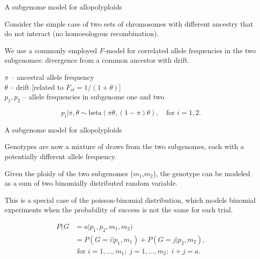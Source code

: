 \documentclass[presentation,sansserif]{beamer}
\begin{document}
\begin{frame}[t]{A subgenome model for allopolyploids}
\pause

Consider the simple case of two sets of chromosomes with different ancestry that do not interact (no homoeologous recombination).
\vspace{0.3in}
\pause

We use a commonly employed $F$-model for correlated allele frequencies in the two subgenomes: divergence from a common ancestor with drift.
\vspace{0.3in}
\pause


$\pi$ -- ancestral allele frequency\\
$\theta$ -- drift [related to $F_{st} = 1/(1+\theta)$] \\
$p_1,p_2$ -- allele frequencies in subgenome one and two\\
\vspace{0.3in}
\pause

\begin{equation}
p_i|\pi,\theta \sim \text{beta}(\pi\theta,(1-\pi)\theta), \quad \text{for } i=1,2.
\end{equation}

\end{frame}

\begin{frame}[t]{A subgenome model for allopolyploids}

Genotypes are now a mixture of draws from the two subgenomes, each with a potentially different allele frequency.
\vspace{0.25in}
\pause

Given the ploidy of the two subgenomes ($m_1$,$m_2$), the genotype can be modeled as a sum of two binomially distributed random variable.
\vspace{0.25in}
\pause

This is a special case of the poisson-binomial distribution, which models binomial experiments when the probability of success is not the same for each trial.
\pause

\begin{align}
P(G&=a|p_1,p_2,m_1,m_2) \nonumber \\[0.05in]
&= P(G=i|p_1,m_1) + P(G=j|p_2,m_2), \nonumber \\[0.05in]
&\text{ for } i=1,\dots,m_1; \; j=1,\ldots,m_2; \; i+j=a.
\end{align}

\end{frame}
\end{document}
